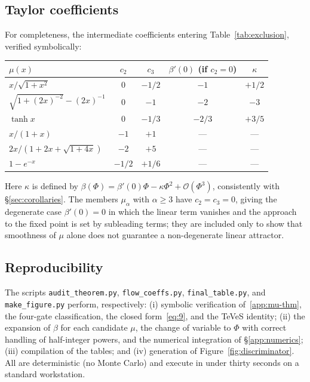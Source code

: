\documentclass[11pt]{article}
\theoremstyle{plain}
\begin{document}
\subsection{Taylor coefficients}

For completeness, the intermediate coefficients entering
Table~\ref{tab:exclusion}, verified symbolically:
\begin{center}
\begin{tabular}{lcccc}
\toprule
$\mu(x)$ & $c_{2}$ & $c_{3}$ & $\beta'(0)$ (if $c_{2}=0$) & $\kappa$ \\
\midrule
$x/\sqrt{1+x^{2}}$             & $0$    & $-1/2$ & $-1$   & $+1/2$ \\
$\sqrt{1+(2x)^{-2}}-(2x)^{-1}$ & $0$    & $-1$   & $-2$   & $-3$   \\
$\tanh x$                      & $0$    & $-1/3$ & $-2/3$ & $+3/5$ \\
$x/(1+x)$                      & $-1$   & $+1$   & ---    & ---    \\
$2x/(1+2x+\sqrt{1+4x})$        & $-2$   & $+5$   & ---    & ---    \\
$1-e^{-x}$                     & $-1/2$ & $+1/6$ & ---    & ---    \\
\bottomrule
\end{tabular}
\end{center}
Here $\kappa$ is defined by $\beta(\Phi)=\beta'(0)\Phi-\kappa\Phi^{2}
+\mathcal{O}(\Phi^{3})$, consistently with \S\ref{sec:corollaries}. The members
$\mu_{\alpha}$ with $\alpha\ge3$ have $c_{2}=c_{3}=0$, giving the degenerate
case $\beta'(0)=0$ in which the linear term vanishes and the approach to the
fixed point is set by subleading terms; they are included only to show that
smoothness of $\mu$ alone does not guarantee a non-degenerate linear attractor.

\subsection{Reproducibility}

The scripts \verb|audit_theorem.py|, \verb|flow_coeffs.py|,
\verb|final_table.py|, and \verb|make_figure.py| perform, respectively:
(i) symbolic verification of~\eqref{app:mu-thm}, the four-gate classification,
the closed form~\eqref{eq:9}, and the TeVeS identity; (ii) the expansion of
$\beta$ for each candidate $\mu$, the change of variable to $\Phi$ with correct
handling of half-integer powers, and the numerical integration of
\S\ref{app:numerics}; (iii) compilation of the tables; and (iv) generation of
Figure~\ref{fig:discriminator}. All are deterministic (no Monte Carlo) and
execute in under thirty seconds on a standard workstation.
\end{document}
